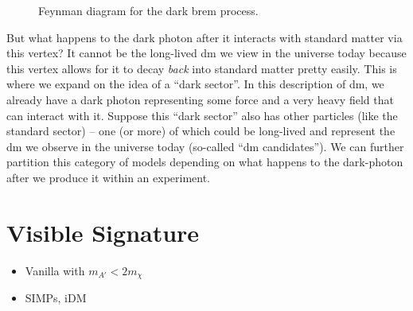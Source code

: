 \begin{figure}
    \centering
    \caption{
        Feynman diagram for the dark brem process.
    }
    \label{fig:dark-brem-feynman}
\end{figure}

But what happens to the dark photon after it interacts with standard matter via this vertex?
It cannot be the long-lived \gls{dm} we view in the universe today because this vertex allows for
it to decay \emph{back} into standard matter pretty easily. This is where we expand on the idea of
a ``dark sector''. In this description of \gls{dm}, we already have a dark photon representing some
force and a very heavy field that can interact with it. Suppose this ``dark sector'' also has other
particles (like the standard sector) -- one (or more) of which could be long-lived and represent
the \gls{dm} we observe in the universe today (so-called ``\gls{dm} candidates''). We can further
partition this category of models depending on what happens to the \gls{dark-photon} after we produce
it within an experiment.

\section{Visible Signature}
\begin{itemize}
    \item Vanilla with $m_{A'} < 2m_\chi$
    \item SIMPs, iDM
\end{itemize}

